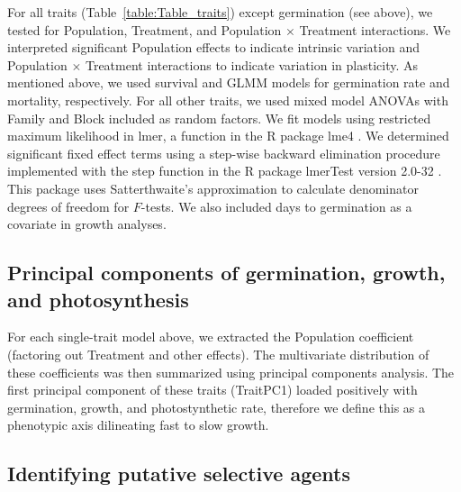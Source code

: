 \documentclass[11pt, oneside]{article}
\newcommand{\pkg}[1]{{\fontseries{b}\selectfont #1}}
\begin{document}
For all traits (Table~\ref{table:Table_traits}) except germination (see above), we tested for Population, Treatment, and Population $\times$ Treatment interactions. We interpreted significant Population effects to indicate intrinsic variation and Population $\times$ Treatment interactions to indicate variation in plasticity. As mentioned above, we used survival and GLMM models for germination rate and mortality, respectively. For all other traits, we used mixed model ANOVAs with Family and Block included as random factors. We fit models using restricted maximum likelihood in lmer, a function in the R package \pkg{lme4} \citep{Bates_etal_2015}. We determined significant fixed effect terms using a step-wise backward elimination procedure implemented with the step function in the R package \pkg{lmerTest} version 2.0-32 \citep{Kuznetsova_etal_2016}. This package uses Satterthwaite's approximation to calculate denominator degrees of freedom for $F$-tests. We also included days to germination as a covariate in growth analyses. %

\subsection*{Principal components of germination, growth, and photosynthesis}
For each single-trait model above, we extracted the Population coefficient (factoring out Treatment and other effects). The multivariate distribution of these coefficients was then summarized using principal components analysis. The first principal component of these traits (TraitPC1) loaded positively with germination, growth, and photostynthetic rate, therefore we define this as a phenotypic axis dilineating fast to slow growth.



\subsection*{Identifying putative selective agents}
\end{document}

